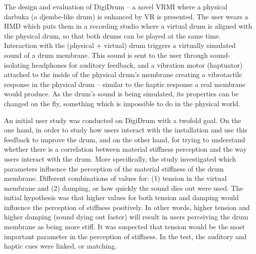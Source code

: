     The design and evaluation of DigiDrum -- a novel VRMI where a physical darbuka (a djembe-like drum) is enhanced by VR is presented. The user wears a HMD which puts them in a recording studio where a virtual drum is aligned with the physical drum, so that both drums can be played at the same time. Interaction with the (physical + virtual) drum triggers a virtually simulated sound of a drum membrane. This sound is sent to the user through sound-isolating headphones for auditory feedback, and a vibration motor (haptuator) attached to the inside of the physical drum's membrane creating a vibrotactile response in the physical drum -- similar to the haptic response a real membrane would produce. As the drum's sound is being simulated, its properties can be changed on the fly, something which is impossible to do in the physical world. 
    
    
    An initial user study was conducted on DigiDrum with a twofold goal. On the one hand, in order to study how users interact with the installation and use this feedback to improve the drum, and on the other hand, for trying to understand whether there is a correlation between material stiffness perception and the way users interact with the drum. More specifically, the study investigated which parameters influence the perception of the material stiffness of the drum membrane. Different combinations of values for: (1) tension in the virtual membrane and (2) damping, or how quickly the sound dies out were used. The initial hypothesis was that higher values for both tension and damping would influence the perception of stiffness positively. In other words, higher tension and higher damping (sound dying out faster) will result in users perceiving the drum membrane as being more stiff. It was suspected that tension would be the most important parameter in the perception of stiffness. In the test, the auditory and haptic cues were linked, or matching. 
    
